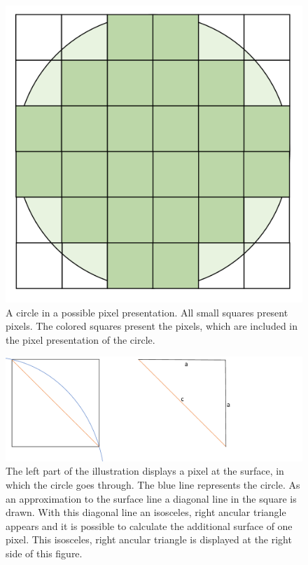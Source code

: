 \begin{figure}
	\center
	\includegraphics[scale=0.15]{figures/PixelCircleSquare.png}
	\caption{A circle in a possible pixel presentation. All small squares present pixels. The colored squares present the pixels, which are included in the pixel presentation of the circle.}
	\label{img:CircleSquarePixels}
\end{figure}

\begin{figure}
	\center
	\includegraphics[scale=0.3]{figures/SurfaceApproximationSQRT2.png}
	\caption{The left part of the illustration displays a pixel at the surface, in which the circle goes through. The blue line represents the circle. As an approximation to the surface line a diagonal line in the square is drawn. With this diagonal line an isosceles, right ancular triangle appears and it is possible to calculate the additional surface of one pixel. This isosceles, right ancular triangle is displayed at the right side of this figure.}
	\label{img:ApproximationSQRT2}
\end{figure}

